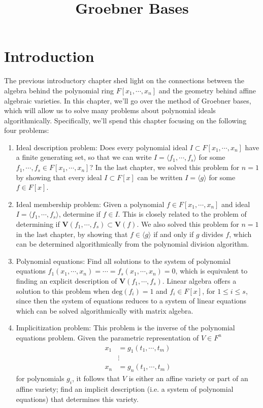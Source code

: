 \documentclass{article}
\begin{document}
\title{Groebner Bases}
\maketitle

\section{Introduction}
The previous introductory chapter shed light on the connections between the algebra behind the polynomial ring $ F[x_1, \cdots, x_n] $ and the geometry behind affine algebraic varieties. In this chapter, we'll go over the method of Groebner bases, which will allow us to solve many problems about polynomial ideals algorithmically. Specifically, we'll spend this chapter focusing on the following four problems:
\begin{enumerate}
	\item Ideal description problem: Does every polynomial ideal $ I \subset F[x_1, \cdots, x_n] $ have a finite generating set, so that we can write $ I = \langle f_1, \cdots, f_s \rangle $ for some $ f_1, \cdots, f_s \in F[x_1, \cdots, x_n] $?
	\newline
	In the last chapter, we solved this problem for $ n = 1 $ by showing that every ideal $ I \subset F[x] $ can be written $ I = \langle g \rangle $ for some $ f \in F[x] $.
	\item Ideal membership problem: Given a polynomial $ f \in F[x_1, \cdots, x_n] $ and ideal $ I = \langle f_1, \cdots, f_s \rangle $, determine if $ f \in I $. This is closely related to the problem of determining if $ \mathbf{V}(f_1, \cdots, f_s) \subset \mathbf{V}(f) $.
	\newline
	We also solved this problem for $ n = 1 $ in the last chapter, by showing that $ f \in \langle g \rangle $ if and only if $ g $ divides $ f $, which can be determined algorithmically from the polynomial division algorithm.
	\item Polynomial equations: Find all solutions to the system of polynomial equations $ f_1(x_1, \cdots, x_n) = \cdots = f_s(x_1, \cdots, x_n) = 0 $, which is equivalent to finding an explicit description of $ \mathbf{V}(f_1, \cdots, f_s) $.
	\newline
	Linear algebra offers a solution to this problem when $ \text{deg}(f_i) = 1 $ and $ f_i \in F[x] $, for $ 1 \leq i \leq s $, since then the system of equations reduces to a system of linear equations which can be solved algorithmically with matrix algebra.
	\item Implicitization problem: This problem is the inverse of the polynomial equations problem. Given the parametric representation of $ V \in F^n $
	$$ \begin{aligned}
		x_1 &= g_1(t_1, \cdots, t_m) \\
		&\vdots \\
		x_n &= g_n(t_1, \cdots, t_m)
	\end{aligned} $$
	for polynomials $ g_i $, it follows that $ V $ is either an affine variety or part of an affine variety; find an implicit description (i.e. a system of polynomial equations) that determines this variety.
\end{enumerate}
\end{document}
